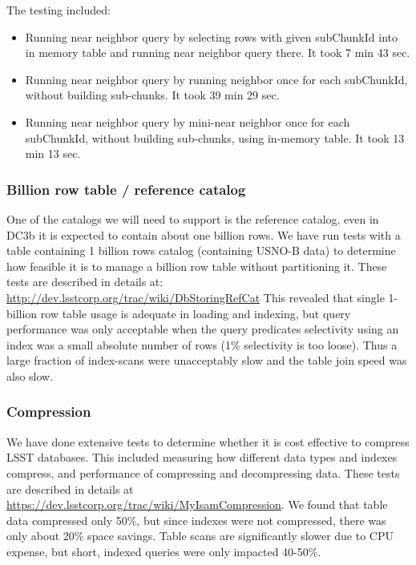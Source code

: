 \documentclass[DM,lsstdraft,toc]{lsstdoc}
\begin{document}
The testing included:

\begin{itemize}
\item
  Running near neighbor query by selecting rows with given subChunkId
  into in memory table and running near neighbor query there. It took 7
  min 43 sec.
\item
  Running near neighbor query by running neighbor once for each
  subChunkId, without building sub-chunks. It took 39 min 29 sec.
\item
  Running near neighbor query by mini-near neighbor once for each
  subChunkId, without building sub-chunks, using in-memory table. It
  took 13 min 13 sec.
\end{itemize}

\subsubsection{Billion row table / reference
catalog}\label{billion-row-table-reference-catalog}

One of the catalogs we will need to support is the reference catalog,
even in DC3b it is expected to contain about one billion rows. We have
run tests with a table containing 1 billion rows catalog (containing
USNO-B data) to determine how feasible it is to manage a billion row
table without partitioning it. These tests are described in details at:
\url{http://dev.lsstcorp.org/trac/wiki/DbStoringRefCat} This revealed
that single 1-billion row table usage is adequate in loading and
indexing, but query performance was only acceptable when the query
predicates selectivity using an index was a small absolute number of
rows (1\% selectivity is too loose). Thus a large fraction of
index-scans were unacceptably slow and the table join speed was also
slow.

\subsubsection{Compression}\label{compression}

We have done extensive tests to determine whether it is cost effective
to compress LSST databases. This included measuring how different data
types and indexes compress, and performance of compressing and
decompressing data. These tests are described in details at
\url{https://dev.lsstcorp.org/trac/wiki/MyIsamCompression}. We found
that table data compressed only 50\%, but since indexes were not
compressed, there was only about 20\% space savings. Table scans are
significantly slower due to CPU expense, but short, indexed queries were
only impacted 40-50\%.
\end{document}
